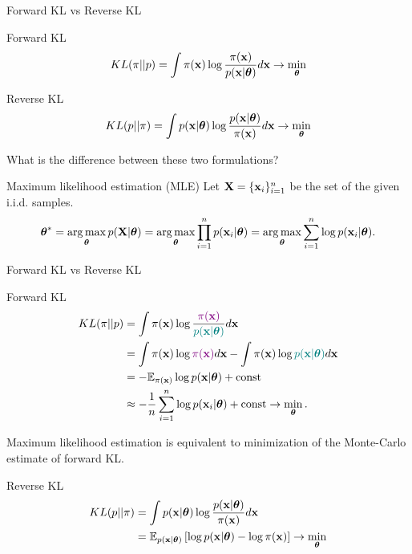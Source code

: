 \begin{frame}{Forward KL vs Reverse KL}
	\begin{block}{Forward KL}
		\vspace{-0.2cm}
		\[
		KL(\pi || p) = \int \pi (\mathbf{x}) \log \frac{\pi(\mathbf{x})}{p(\mathbf{x} | \boldsymbol{\theta})} d \mathbf{x} \rightarrow \min_{\boldsymbol{\theta}}
		\]
	\end{block}
	\begin{block}{Reverse KL}
		\vspace{-0.2cm}
		\[
		KL(p || \pi) = \int p (\mathbf{x}| \boldsymbol{\theta}) \log \frac{p(\mathbf{x}| \boldsymbol{\theta})}{\pi(\mathbf{x})} d \mathbf{x} \rightarrow \min_{\boldsymbol{\theta}}
		\]
	\end{block}
	What is the difference between these two formulations?
	
	\begin{block}{Maximum likelihood estimation (MLE)}
	Let $\mathbf{X} = \{\mathbf{x}_i\}_{i=1}^n$ be the set of the given i.i.d. samples.
		\vspace{-0.3cm}
		\[
		\boldsymbol{\theta}^* = \operatorname*{arg\,max}_{\boldsymbol{\theta}} p(\mathbf{X} | \boldsymbol{\theta}) = \operatorname*{arg\,max}_{\boldsymbol{\theta}} \prod_{i=1}^n p(\mathbf{x}_i | \boldsymbol{\theta}) = \operatorname*{arg\,max}_{\boldsymbol{\theta}} \sum_{i=1}^n \log p(\mathbf{x}_i | \boldsymbol{\theta}).
		\]
	\end{block}
\end{frame}
\begin{frame}{Forward KL vs Reverse KL}
	\begin{block}{Forward KL}
		\vspace{-0.5cm}
		\begin{align*}
			KL(\pi || p) &= \int \pi (\mathbf{x}) \log \frac{\color{violet}\pi(\mathbf{x})}{\color{teal}p(\mathbf{x} | \boldsymbol{\theta})} d \mathbf{x} \\
			&= \int \pi (\mathbf{x}) \log {\color{violet}\pi(\mathbf{x})} d \mathbf{x} - \int \pi (\mathbf{x}) \log {\color{teal}p(\mathbf{x}| \boldsymbol{\theta})} d \mathbf{x} \\
			&= - \mathbb{E}_{\pi(\mathbf{x})} \log p(\mathbf{x} | \boldsymbol{\theta}) + \text{const} \\
			& \approx - \frac{1}{n} \sum_{i=1}^n \log p(\mathbf{x}_i | \boldsymbol{\theta}) + \text{const} \rightarrow \min_{\boldsymbol{\theta}}.
		\end{align*}
		\vspace{-0.5cm}
	\end{block}
	Maximum likelihood estimation is equivalent to minimization of the Monte-Carlo estimate of forward KL.
	\begin{block}{Reverse KL}
		\vspace{-0.5cm}
		\begin{align*}
			KL(p || \pi) &= \int p(\mathbf{x} | \boldsymbol{\theta}) \log \frac{p(\mathbf{x} | \boldsymbol{\theta})}{\pi(\mathbf{x})} d \mathbf{x} \\
			&= \mathbb{E}_{p(\mathbf{x} | \boldsymbol{\theta})} \left[\log p(\mathbf{x} | \boldsymbol{\theta}) - \log \pi(\mathbf{x})\right] \rightarrow \min_{\boldsymbol{\theta}}
		\end{align*}
		\vspace{-0.7cm}
	\end{block}
\end{frame}
